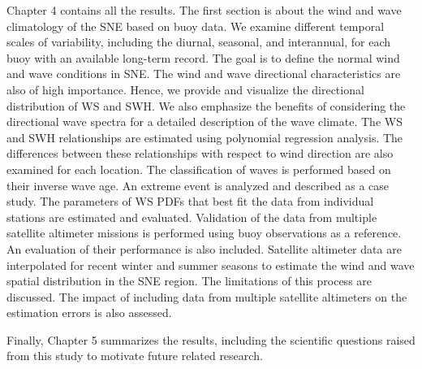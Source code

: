 Chapter 4 contains all the results. The first section is about the wind and wave climatology of the SNE based on  buoy data. We examine different temporal scales of variability, including the diurnal, seasonal, and interannual, for each buoy with an available long-term record. The goal is to define the normal wind and wave conditions in SNE. The wind and wave directional characteristics are also of high importance. Hence, we provide and visualize the directional distribution of WS and SWH. We also emphasize the benefits of considering the directional wave spectra for a detailed description of the wave climate. The WS and SWH relationships are estimated using polynomial regression analysis. The differences between these relationships with respect to wind direction are also examined for each location. The classification of waves is performed based on their inverse wave age. An extreme event is analyzed and described as a case study. The parameters of WS PDFs that best fit the data from individual stations are estimated and evaluated. Validation of the data from multiple satellite altimeter missions is performed using buoy observations as a reference. An evaluation of their performance is also included. Satellite altimeter data are interpolated for recent winter and summer seasons to estimate the wind and wave spatial distribution in the SNE region. The limitations of this process are discussed. The impact of including data from multiple satellite altimeters on the estimation errors is also assessed.


Finally, Chapter 5 summarizes the results, including the scientific questions raised from this study to motivate future related research.




\newcommand{\keyword}[1]{\textbf{#1}}
\newcommand{\tabhead}[1]{\textbf{#1}}
\newcommand{\code}[1]{\texttt{#1}}
\newcommand{\file}[1]{\texttt{\bfseries#1}}
\newcommand{\option}[1]{\texttt{\itshape#1}}




